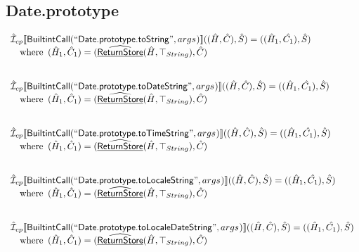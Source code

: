\documentclass{article}
\newcommand{\SF}[1]{\mbox{\textsf{#1}}}
\newcommand{\wherec}[1]{{\rm where}\begin{array}[t]{l}#1\end{array}}
\newcommand{\aI}{\hat{\mathcal{I}}}
\newcommand{\lbr}{\llbracket}
\newcommand{\rbr}{\rrbracket}
\newcommand{\ahf}[1]{\widehat{\underline{\sf #1}}}
\begin{document}
\subsection{Date.prototype}
\[
\begin{array}{l}
\aI _{cp}\lbr \SF{BuiltintCall}(``\SF{Date.prototype.toString}",args_{})\rbr((\hat{H},\hat{C}), \hat{S})
  = ((\hat{H}_1, \hat{C_1}), \hat{S})\\
\quad\wherec{
  (\hat{H}_1, \hat{C}_1) = (\ahf{ReturnStore}(\hat{H},\top_{String}), \hat{C})\\
  }\\
\\\\


\aI _{cp}\lbr \SF{BuiltintCall}(``\SF{Date.prototype.toDateString}",args_{})\rbr((\hat{H},\hat{C}), \hat{S})
  = ((\hat{H}_1, \hat{C_1}), \hat{S})\\
\quad\wherec{
  (\hat{H}_1, \hat{C}_1) = (\ahf{ReturnStore}(\hat{H},\top_{String}), \hat{C})\\
  }\\
\\\\


\aI _{cp}\lbr \SF{BuiltintCall}(``\SF{Date.prototype.toTimeString}",args_{})\rbr((\hat{H},\hat{C}), \hat{S})
  = ((\hat{H}_1, \hat{C_1}), \hat{S})\\
\quad\wherec{
  (\hat{H}_1, \hat{C}_1) = (\ahf{ReturnStore}(\hat{H},\top_{String}), \hat{C})\\
  }\\
\\\\


\aI _{cp}\lbr \SF{BuiltintCall}(``\SF{Date.prototype.toLocaleString}",args_{})\rbr((\hat{H},\hat{C}), \hat{S})
  = ((\hat{H}_1, \hat{C_1}), \hat{S})\\
\quad\wherec{
  (\hat{H}_1, \hat{C}_1) = (\ahf{ReturnStore}(\hat{H},\top_{String}), \hat{C})\\
  }\\
\\\\


\aI _{cp}\lbr \SF{BuiltintCall}(``\SF{Date.prototype.toLocaleDateString}",args_{})\rbr((\hat{H},\hat{C}), \hat{S})
  = ((\hat{H}_1, \hat{C_1}), \hat{S})\\
\quad\wherec{
  (\hat{H}_1, \hat{C}_1) = (\ahf{ReturnStore}(\hat{H},\top_{String}), \hat{C})\\
  }\\
\\\\



\end{array}\]
\end{document}

